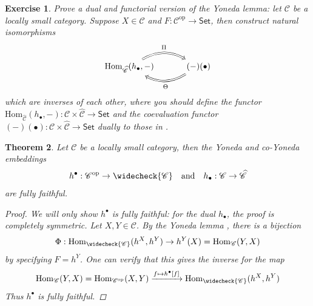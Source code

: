 \documentclass[10pt]{book}
\theoremstyle{bookplain}
\newtheorem{theorem}{Theorem}[section]
\theoremstyle{bookdefinition}
\newtheorem{exercise}[theorem]{Exercise}
\theoremstyle{bookremark}
\begin{document}
\begin{exercise}Prove a dual and functorial version of the Yoneda lemma: let $\mathscr{C}$ be a locally small category. Suppose $X\in\mathscr{C}$ and $F:\mathscr{C}^{\mathrm{op}}\rightarrow\mathsf{Set}$, then construct natural isomorphisms
    \[\begin{tikzcd}[column sep=3em] %
        {\mathrm{Hom}_{\widehat{\mathscr{C}}}(h_{\bullet},-)}
        \arrow[Rightarrow, r, bend left=30, "\Pi"{yshift=2pt}]
        & {(-)(\bullet)}
        \arrow[Rightarrow, l, bend left=30, "\Theta"{yshift=-2pt}]
    \end{tikzcd}
    \]
    which are inverses of each other, where you should define the functor $\mathrm{Hom}_{\widehat{\mathscr{C}}}(h_{\bullet},-):\mathscr{C}\times\widehat{\mathscr{C}}\rightarrow\mathsf{Set}$ and the \textit{coevaluation functor} $(-)(\bullet):\mathscr{C}\times \widehat{\mathscr{C}}\rightarrow\mathsf{Set}$ dually to those in . 
\end{exercise}
\begin{theorem}\label{thm:yff}Let $\mathscr{C}$ be a locally small category, then the Yoneda and co-Yoneda embeddings 
    \[h^\bullet: \mathscr{C}^{\mathrm{op}}\rightarrow \widecheck{\mathscr{C}}\quad\mathrm{and}\quad h_\bullet: \mathscr{C}\rightarrow \widehat{\mathscr{C}}\]
    are fully faithful. 
    \begin{proof}
        We will only show $h^\bullet$ is fully faithful: for the dual $h_\bullet$, the proof is completely symmetric. 
        Let $X,Y\in\mathscr{C}$. By the Yoneda lemma , there is a bijection 
        \[\Phi:\mathrm{Hom}_{\widecheck{\mathscr{C}}}(h^X, h^Y)\rightarrow h^Y(X)=\mathrm{Hom}_{\mathscr{C}}(Y,X)\]
        by specifying $F=h^Y$. One can verify that this gives the inverse for the map
        \[\mathrm{Hom}_{\mathscr{C}}(Y,X)=\mathrm{Hom}_{\mathscr{C}^{\mathrm{op}}}(X,Y)\xrightarrow{f\mapsto h^\bullet\left[f\right]} \mathrm{Hom}_{\widecheck{\mathscr{C}}}(h^X, h^Y)\]
        Thus $h^\bullet$ is fully faithful.\end{proof}
\end{theorem}
\end{document}
